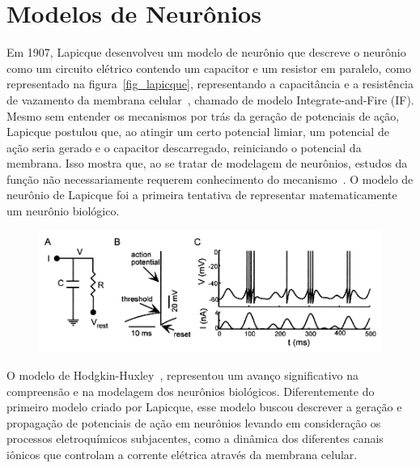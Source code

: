 \section{Modelos de Neurônios}\label{section_modelos_neuronios} 

Em 1907, Lapicque desenvolveu um modelo de neurônio que descreve o neurônio como um circuito elétrico contendo um capacitor e um
resistor em paralelo, como representado na figura~\ref{fig_lapicque}, representando a capacitância e a resistência de vazamento da
membrana celular~\cite{lapicqueRecherches1907}, chamado de modelo Integrate-and-Fire (IF). Mesmo sem entender os mecanismos por
trás da geração de potenciais de ação, Lapicque postulou que, ao atingir um certo potencial limiar, um potencial de ação seria
gerado e o capacitor descarregado, reiniciando o potencial da membrana. Isso mostra que, ao se tratar de modelagem de neurônios,
estudos da função não necessariamente requerem conhecimento do mecanismo~\cite{abbottLapicque1999}. O modelo de neurônio de
Lapicque foi a primeira tentativa de representar matematicamente um neurônio biológico.

\begin{figure}[!ht]
\centering
\includegraphics[width=\linewidth]{figuras/lapicque.png}
\end{figure}

O modelo de Hodgkin-Huxley~\cite{hodgkinQuantitative1952}, representou um avanço significativo na compreensão e na modelagem dos
neurônios biológicos. Diferentemente do primeiro modelo criado por Lapicque, esse modelo buscou descrever a geração e propagação
de potenciais de ação em neurônios levando em consideração os processos eletroquímicos subjacentes, como a dinâmica dos diferentes
canais iônicos que controlam a corrente elétrica através da membrana celular.

